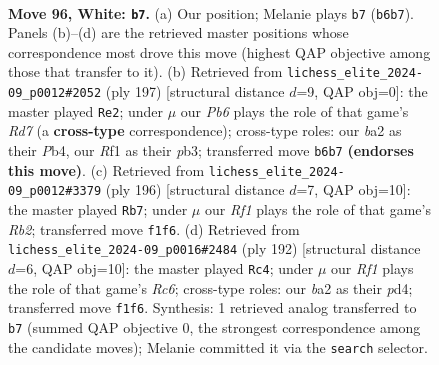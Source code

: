 \documentclass[11pt]{article}
\begin{document}
\clearpage

\begin{figure}[p]\centering
\begin{subfigure}{0.46\textwidth}\centering
\resizebox{\linewidth}{!}{%
\newchessgame
\chessboard[
  setfen={1r6/3k4/1P6/6R1/8/4K3/b7/5R2 w - - 11 96},
  showmover=false,
  pgfstyle=straightmove, color=movearrow, markmove={b6-b7}
]}
\caption{}
\end{subfigure}\hfill
\begin{subfigure}{0.46\textwidth}\centering
\resizebox{\linewidth}{!}{%
\newchessgame
\chessboard[
  setfen={1R6/8/8/5k2/1p6/1P6/3r4/2K5 b - - 32 99},
  showmover=false,
  pgfstyle=straightmove, color=movearrow, markmove={d2-e2}
]}
\caption{}
\end{subfigure}
\\[4pt]
\begin{subfigure}{0.46\textwidth}\centering
\resizebox{\linewidth}{!}{%
\newchessgame
\chessboard[
  setfen={5k2/7P/8/5K2/8/7r/1R6/8 w - - 27 99},
  showmover=false,
  pgfstyle=straightmove, color=movearrow, markmove={b2-b7}
]}
\caption{}
\end{subfigure}\hfill
\begin{subfigure}{0.46\textwidth}\centering
\resizebox{\linewidth}{!}{%
\newchessgame
\chessboard[
  setfen={r7/8/2R5/8/P2p4/5K2/3k4/8 w - - 1 97},
  showmover=false,
  pgfstyle=straightmove, color=movearrow, markmove={c6-c4}
]}
\caption{}
\end{subfigure}
\caption{\textbf{Move 96, White: \texttt{b7}.} (a) Our position; Melanie plays \texttt{b7} (\texttt{b6b7}). Panels (b)--(d) are the retrieved master positions whose correspondence most drove this move (highest QAP objective among those that transfer to it). (b) Retrieved from \texttt{lichess\_elite\_2024-09\_p0012\#2052} (ply 197) [structural distance $d$=9, QAP obj=0]: the master played \texttt{Re2}; under $\mu$ our \emph{Pb6} plays the role of that game's \emph{Rd7} (a \textbf{cross-type} correspondence); cross-type roles: our \emph{b}a2 as their \emph{P}b4, our \emph{R}f1 as their \emph{p}b3; transferred move \texttt{b6b7} \textbf{(endorses this move)}. (c) Retrieved from \texttt{lichess\_elite\_2024-09\_p0012\#3379} (ply 196) [structural distance $d$=7, QAP obj=10]: the master played \texttt{Rb7}; under $\mu$ our \emph{Rf1} plays the role of that game's \emph{Rb2}; transferred move \texttt{f1f6}. (d) Retrieved from \texttt{lichess\_elite\_2024-09\_p0016\#2484} (ply 192) [structural distance $d$=6, QAP obj=10]: the master played \texttt{Rc4}; under $\mu$ our \emph{Rf1} plays the role of that game's \emph{Rc6}; cross-type roles: our \emph{b}a2 as their \emph{p}d4; transferred move \texttt{f1f6}. Synthesis: 1 retrieved analog transferred to \texttt{b7} (summed QAP objective 0, the strongest correspondence among the candidate moves); Melanie committed it via the \texttt{search} selector.}
\label{fig:thought-m190}
\end{figure}
\end{document}
